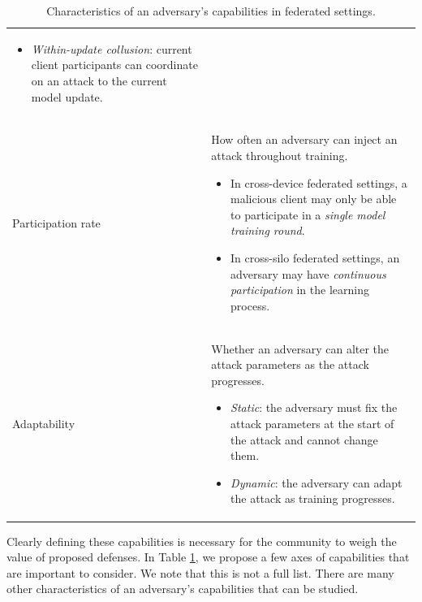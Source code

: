 \documentclass[11pt]{article}
\begin{document}
\begin{table}[h]
\begin{center}
\begin{tabularx}{\textwidth}{lX}
\begin{itemize}[leftmargin=*]
    \item \emph{Within-update collusion}: current client participants can coordinate on an attack to the current model update.
\end{itemize}
\\[-.5em]
\raggedright Participation rate & How often an adversary can inject an attack throughout training. 
\begin{itemize}[leftmargin=*]
    \setlength\itemsep{0.05em}
    \item In cross-device federated settings, a malicious client may only be able to participate in a \emph{single model training round}.
    \item In cross-silo federated settings, an adversary may have \emph{continuous participation} in the learning process.
\end{itemize}
\\[-.5em]
Adaptability & Whether an adversary can alter the attack parameters as the attack progresses.
\begin{itemize}[leftmargin=*]
    \setlength\itemsep{0.05em}
    \item \emph{Static}: the adversary must fix the attack parameters at the start of the attack and cannot change them.
    \item \emph{Dynamic}: the adversary can adapt the attack as training progresses.
\end{itemize}
\\
\bottomrule
\end{tabularx} 
\end{center}
\caption{Characteristics of an adversary's capabilities in federated settings. } 
\label{table:capabilities}
\end{table}
\restoregeometry

Clearly defining these capabilities is necessary for the community to weigh the value of proposed defenses. In Table \ref{table:capabilities}, we propose a few axes of capabilities that are important to consider. We note that this is not a full list. There are many other characteristics of an adversary's capabilities that can be studied.
\end{document}
